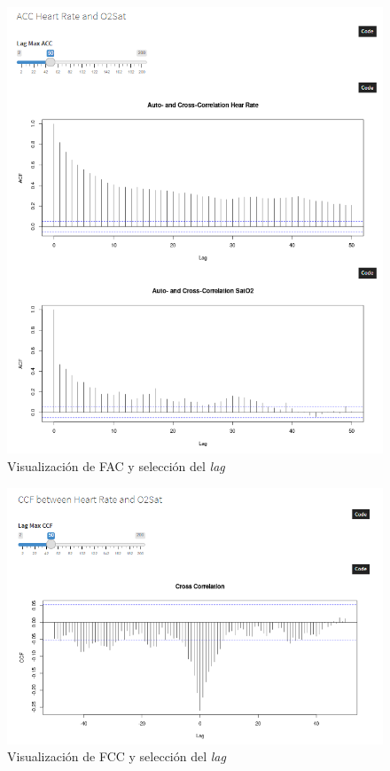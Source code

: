 \begin{figure}[H]
    \centering
    \includegraphics[scale = 1]{./img/graphic4.png}
    \caption{Visualización de FAC y selección del \textit{lag}}\label{fig:visualizacion-datos-4}
\end{figure}

\begin{figure}[H]
    \centering
    \includegraphics[scale = 1]{./img/graphic5.png}
    \caption{Visualización de FCC y selección del \textit{lag}}\label{fig:visualizacion-datos-5}
\end{figure}
\newpage

